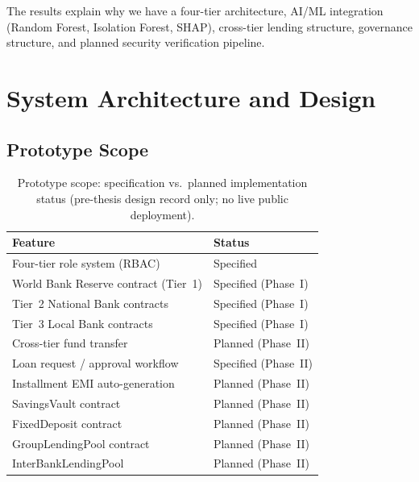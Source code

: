 \documentclass[12pt,a4paper]{report}
\newcommand{\tmarkPartial}{\faHourglassHalf}
\newcommand{\tmarkPlanned}{\textcolor{black!55}{\faCircle}}
\newcommand{\tableheadcolor}{\rowcolor{TableHeadBg}}
\newcommand{\tableheadfont}{\bfseries}
\begin{document}
The results explain why we have a four-tier architecture, AI/ML integration (Random Forest, Isolation Forest, SHAP), cross-tier lending structure, governance structure, and planned security verification pipeline.


\chapter{System Architecture and Design}

\section{Prototype Scope}
\label{sec:prototype-scope}

\begin{table}[H]
\centering
\caption[Prototype scope and implementation status]{Prototype scope: specification vs.\ planned implementation status (pre-thesis design record only; no live public deployment).}
\label{tab:prototype-scope}
\footnotesize
\renewcommand{\arraystretch}{0.88}
\setlength{\tabcolsep}{3pt}
\begin{tabular}{@{}p{7.1cm}>{\raggedleft\arraybackslash}p{5.9cm}@{}}
\toprule
\tableheadcolor
\tableheadfont Feature & \tableheadfont Status \\
\midrule
Four-tier role system (RBAC) & \tmarkPartial{} Specified \\
\rowcolor{RowShade}
World Bank Reserve contract (Tier~1) & \tmarkPartial{} Specified (Phase~I) \\
Tier~2 National Bank contracts & \tmarkPartial{} Specified (Phase~I) \\
\rowcolor{RowShade}
Tier~3 Local Bank contracts & \tmarkPartial{} Specified (Phase~I) \\
Cross-tier fund transfer & \tmarkPlanned{} Planned (Phase~II) \\
\rowcolor{RowShade}
Loan request / approval workflow & \tmarkPartial{} Specified (Phase~II) \\
Installment EMI auto-generation & \tmarkPlanned{} Planned (Phase~II) \\
\rowcolor{RowShade}
SavingsVault contract & \tmarkPlanned{} Planned (Phase~II) \\
FixedDeposit contract & \tmarkPlanned{} Planned (Phase~II) \\
\rowcolor{RowShade}
GroupLendingPool contract & \tmarkPlanned{} Planned (Phase~II) \\
InterBankLendingPool & \tmarkPlanned{} Planned (Phase~II) \\

\end{tabular}
\end{table}
\end{document}
